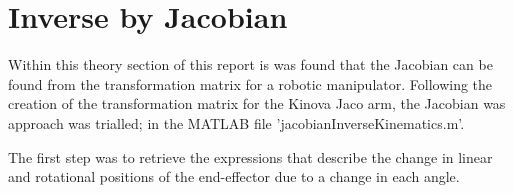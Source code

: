 \documentclass[12pt,openany,a4paper]{book}
\begin{document}
%
\clearpage

\section{Inverse by Jacobian}
Within this theory section of this report is was found that the Jacobian can be found from the transformation matrix for a robotic manipulator. Following the creation of the transformation matrix for the Kinova Jaco arm, the Jacobian was approach was trialled; in the MATLAB file 'jacobianInverseKinematics.m'.

The first step was to retrieve the expressions that describe the change in linear and rotational positions of the end-effector due to a change in each angle. 
\end{document}

